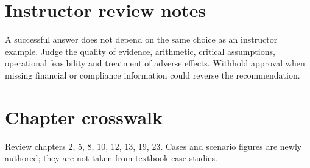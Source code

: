 \documentclass[11pt]{article}
\begin{document}
\section{Instructor review notes}
A successful answer does not depend on the same choice as an instructor example. Judge the quality of evidence, arithmetic, critical assumptions, operational feasibility and treatment of adverse effects. Withhold approval when missing financial or compliance information could reverse the recommendation.
\section{Chapter crosswalk}
Review chapters 2, 5, 8, 10, 12, 13, 19, 23. Cases and scenario figures are newly authored; they are not taken from textbook case studies.
\end{document}
